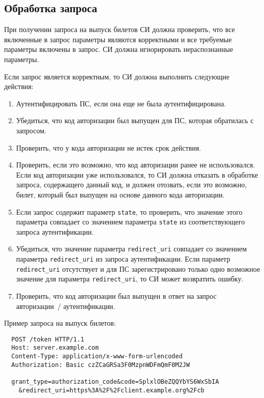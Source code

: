 \label{REQRESP.Token}

\subsection{Обработка запроса}\label{REQRESP.Token.Req}

При получении запроса на выпуск билетов СИ должна проверить, что все включенные в
запрос параметры являются корректными и все требуемые параметры включены в
запрос.
%
СИ должна игнорировать нераспознанные параметры.

Если запрос является корректным, то СИ должна выполнить следующие действия:
\begin{enumerate}
\item 
Аутентифицировать ПС, если она еще не была аутентифицирована.

\item 
Убедиться, что код авторизации был выпущен для ПС, которая обратилась с запросом.

\item
Проверить, что у кода авторизации не истек срок действия.

\item
Проверить, если это возможно, что код авторизации ранее не использовался. Если
код авторизации уже использовался, то СИ должна отказать в обработке запроса,
содержащего данный код, и должен отозвать, если это возможно, билет, который был
выпущен на основе данного кода авторизации.

\item
Если запрос содержит параметр \lstinline{state}, то проверить, что значение
этого параметра совпадает со значением параметра \lstinline{state} из
соответствующего запроса аутентификации.

\item
Убедиться, что значение параметра \lstinline{redirect_uri} совпадает со
значением параметра \lstinline{redirect_uri} из запроса аутентификации. Если
параметр \lstinline{redirect_uri} отсутствует и для ПС зарегистрировано только
одно возможное значение для параметра \lstinline{redirect_uri}, то СИ может
возвратить ошибку.

\item  
Проверить, что код авторизации был выпущен в ответ на запрос авторизации~/ 
аутентификации. 
\end{enumerate}

Пример запроса на выпуск билетов:
\begin{lstlisting}
  POST /token HTTP/1.1
  Host: server.example.com
  Content-Type: application/x-www-form-urlencoded
  Authorization: Basic czZCaGRSa3F0MzpnWDFmQmF0M2JW

  grant_type=authorization_code&code=SplxlOBeZQQYbYS6WxSbIA
    &redirect_uri=https%3A%2F%2Fclient.example.org%2Fcb
\end{lstlisting}

